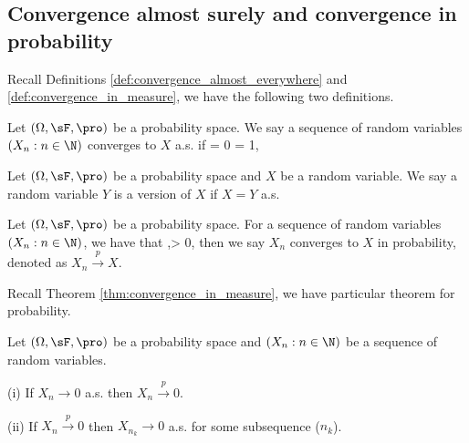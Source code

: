 \subsection{Convergence almost surely and convergence in probability}

Recall Definitions \ref{def:convergence_almost_everywhere} and \ref{def:convergence_in_measure}, we have the following two definitions.

\begin{definition}\label{def:convergence_almost_surely}
Let $(\Omega, \sF, \pro)$ be a probability space. We say a sequence of random variables $(X_n : n \in \N)$ converges to $X$ a.s. if
\be
\pro{} = 0\quad \lra \quad \pro{} = 1,\quad\quad {}
\ee
\end{definition}

\begin{definition}\label{def:version_probability}
Let $(\Omega, \sF, \pro)$ be a probability space and $X$ be a random variable. We say a random variable $Y$ is a version of $X$ if $X=Y$ a.s.
\end{definition}

\begin{definition}\label{def:convergence_in_probability}
Let $(\Omega, \sF, \pro)$ be a probability space. For a sequence of random variables $(X_n : n \in \N)$, we have that
\be
\pro{} ,\quad {}\ve > 0,
\ee
then we say $X_n$ converges to $X$ in probability, denoted as $X_n \stackrel{p}{\longrightarrow} X$.
\end{definition}

Recall Theorem \ref{thm:convergence_in_measure}, we have particular theorem for probability.

\begin{theorem}\label{thm:convergence_in_probability}
Let $(\Omega,\sF,\pro)$ be a probability space and $(X_n : n \in \N)$ be a sequence of random variables.
\ben
\item [(i)] If $X_n \to 0$ a.s. then $X_n \stackrel{p}{\longrightarrow} 0$.
\item [(ii)] If $X_n \stackrel{p}{\longrightarrow} 0$ then $X_{n_k}\to 0$ a.s. for some subsequence ($n_k$).
\een
\end{theorem}

